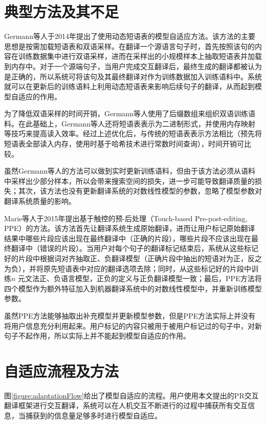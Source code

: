 \documentclass[master, winfont]{njuthesis}
\begin{document}
\section{典型方法及其不足}
\label{section:typical}
Germann等人\cite{germann2014dynamic}于2014年提出了使用动态短语表的模型自适应方法。该方法的主要思想是按需加载短语表\cite{zens2007efficient}和双语采样。在翻译一个源语言句子时，首先按照该句的内容在训练数据集中进行双语采样，进而在采样出的小规模样本上抽取短语表并加载到内存中。对于一个源端句子，当用户完成交互翻译后，最终生成的翻译都被认为是正确的，所以系统可将该句及其最终翻译对作为训练数据加入训练语料中。系统就可以在更新后的训练语料上利用动态短语表来影响后续句子的翻译，从而起到模型自适应的作用。

为了降低双语采样的时间开销，Germann等人使用了后缀数组来组织双语训练语料。在此基础上，Germann等人还将短语表表示为二进制形式，并使用内存映射等技巧来提高读入效率。经过上述优化后，与传统的短语表表示方法相比（预先将短语表全部读入内存，使用时基于哈希技术进行常数时间查询），时间开销可比较。

虽然Germann等人的方法可以做到实时更新训练语料，但由于该方法必须从语料中采样出少部分样本，所以会带来搜索空间的损失，进一步可能导致翻译质量的损失；其次，该方法也没有更新翻译系统的对数线性模型的参数，忽略了模型参数对翻译系统质量的影响。

Marie等人\cite{marietouch}于2015年提出基于触控的预-后处理（Touch-based Pre-post-editing, PPE）的方法。该方法首先让翻译系统生成原始翻译，进而让用户标记原始翻译结果中哪些片段应该出现在最终翻译中（正确的片段），哪些片段不应该出现在最终翻译中（错误的片段）。当用户对每个句子的翻译标记结束后，系统从这些标记好的片段中根据词对齐抽取正、负翻译模型（正确片段中抽出的短语对为正，反之为负），并将原先短语表中对应的翻译选项去除；同时，从这些标记好的片段中训练$n$ 元文法正、负语言模型，正负的定义与正负翻译模型一致；最后，PPE方法将四个模型作为额外特征加入到机器翻译系统中的对数线性模型中，并重新训练模型参数。

虽然PPE方法能够抽取出补充模型并更新模型参数，但是PPE方法实际上并没有将用户信息充分利用起来。用户标记的内容只被用于被用户标记过的句子中，对新句子不起作用，所以实际上并不能起到模型自适应的作用。

\section{自适应流程及方法}
\label{section:adapt}
图\ref{figure:adaptationFlow}给出了模型自适应的流程。用户使用本文提出的PR交互翻译框架进行交互翻译，系统可以在人机交互不断进行的过程中捕获所有交互信息，当捕获到的信息量足够多时进行模型自适应。
\end{document}
